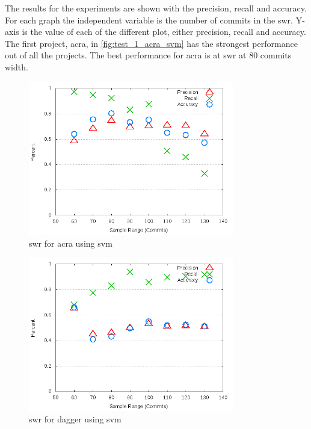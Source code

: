 The results for the experiments are shown with the precision, recall and accuracy. For each graph the independent variable is the number of commits in the \gls{swr}. Y-axis is the value of each of the different plot, either precision, recall and accuracy. The first project, acra, in \autoref{fig:test_1_acra_svm} has the strongest performance out of all the projects. The best performance for acra is at \gls{swr} at 80 commits width. 

\begin{figure}[!ht]
    \centering

        \includegraphics[width=0.8\textwidth]{images/svm/test_1/acra_sample_range}
        \caption{\gls{swr} for acra using \gls{svm}}
        \label{fig:test_1_acra_svm}
\end{figure}

\begin{figure}[!ht]
    \centering
        \includegraphics[width=0.8\textwidth]{images/svm/test_1/dagger_sample_range}
        \caption{\gls{swr} for dagger using \gls{svm}}
        \label{fig:test_1_dagger_svm}
\end{figure}

